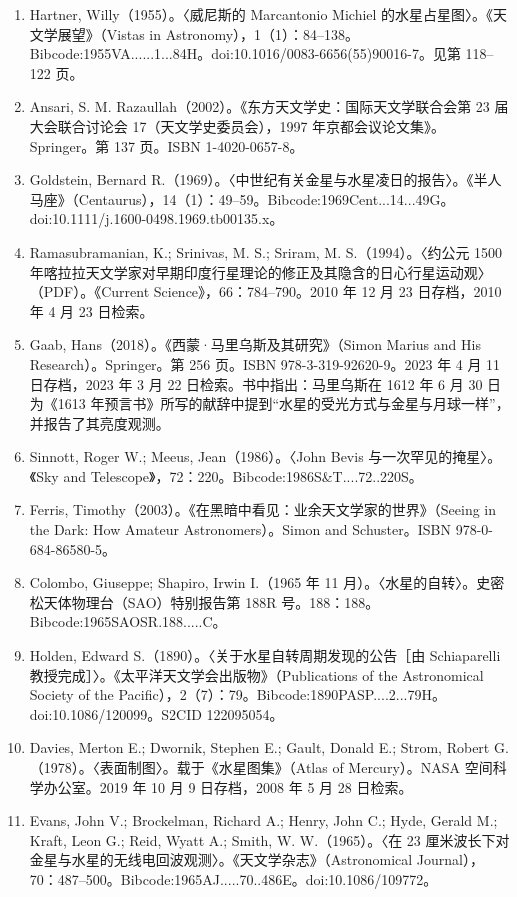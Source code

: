 \begin{enumerate}
    \item Hartner, Willy（1955）。〈威尼斯的 Marcantonio Michiel 的水星占星图〉。《天文学展望》（Vistas in Astronomy），1（1）：84–138。Bibcode:1955VA......1...84H。doi:10.1016/0083-6656(55)90016-7。见第 118–122 页。
    \item Ansari, S. M. Razaullah（2002）。《东方天文学史：国际天文学联合会第 23 届大会联合讨论会 17（天文学史委员会），1997 年京都会议论文集》。Springer。第 137 页。ISBN 1-4020-0657-8。
    \item Goldstein, Bernard R.（1969）。〈中世纪有关金星与水星凌日的报告〉。《半人马座》（Centaurus），14（1）：49–59。Bibcode:1969Cent...14...49G。doi:10.1111/j.1600-0498.1969.tb00135.x。
    \item Ramasubramanian, K.; Srinivas, M. S.; Sriram, M. S.（1994）。〈约公元 1500 年喀拉拉天文学家对早期印度行星理论的修正及其隐含的日心行星运动观〉（PDF）。《Current Science》，66：784–790。2010 年 12 月 23 日存档，2010 年 4 月 23 日检索。
    \item Gaab, Hans（2018）。《西蒙·马里乌斯及其研究》（Simon Marius and His Research）。Springer。第 256 页。ISBN 978-3-319-92620-9。2023 年 4 月 11 日存档，2023 年 3 月 22 日检索。书中指出：马里乌斯在 1612 年 6 月 30 日为《1613 年预言书》所写的献辞中提到“水星的受光方式与金星与月球一样”，并报告了其亮度观测。
    \item Sinnott, Roger W.; Meeus, Jean（1986）。〈John Bevis 与一次罕见的掩星〉。《Sky and Telescope》，72：220。Bibcode:1986S&T....72..220S。
    \item Ferris, Timothy（2003）。《在黑暗中看见：业余天文学家的世界》（Seeing in the Dark: How Amateur Astronomers）。Simon and Schuster。ISBN 978-0-684-86580-5。
    \item Colombo, Giuseppe; Shapiro, Irwin I.（1965 年 11 月）。〈水星的自转〉。史密松天体物理台（SAO）特别报告第 188R 号。188：188。Bibcode:1965SAOSR.188.....C。
    \item Holden, Edward S.（1890）。〈关于水星自转周期发现的公告［由 Schiaparelli 教授完成］〉。《太平洋天文学会出版物》（Publications of the Astronomical Society of the Pacific），2（7）：79。Bibcode:1890PASP....2...79H。doi:10.1086/120099。S2CID 122095054。
    \item Davies, Merton E.; Dwornik, Stephen E.; Gault, Donald E.; Strom, Robert G.（1978）。〈表面制图〉。载于《水星图集》（Atlas of Mercury）。NASA 空间科学办公室。2019 年 10 月 9 日存档，2008 年 5 月 28 日检索。
    \item Evans, John V.; Brockelman, Richard A.; Henry, John C.; Hyde, Gerald M.; Kraft, Leon G.; Reid, Wyatt A.; Smith, W. W.（1965）。〈在 23 厘米波长下对金星与水星的无线电回波观测〉。《天文学杂志》（Astronomical Journal），70：487–500。Bibcode:1965AJ.....70..486E。doi:10.1086/109772。

\end{enumerate}
